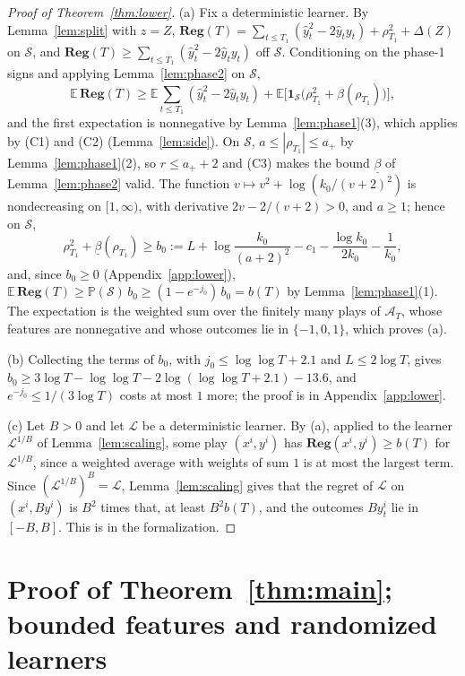 \documentclass[12pt]{amsart}
\theoremstyle{definition}
\numberwithin{equation}{section}
\newcommand{\E}{\mathbb{E}}
\newcommand{\Prob}{\mathbb{P}}
\newcommand{\Reg}{\mathbf{Reg}}
\newcommand{\yh}{\hat y}
\newcommand{\Succ}{\mathcal{S}}
\begin{document}
\begin{proof}[Proof of Theorem~\ref{thm:lower}]
(a) Fix a deterministic learner. By Lemma~\ref{lem:split} with $z=Z$, $\Reg(T)=\sum_{t\le T_1}(\yh_t^2-2\yh_ty_t)+\rho_{T_1}^2+\Delta(Z)$ on $\Succ$, and $\Reg(T)\ge\sum_{t\le T_1}(\yh_t^2-2\yh_ty_t)$ off $\Succ$. Conditioning on the phase-1 signs and applying Lemma~\ref{lem:phase2} on $\Succ$,
\[
\E\,\Reg(T)\ge\E\sum_{t\le T_1}(\yh_t^2-2\yh_ty_t)+\E\bigl[\mathbf 1_\Succ\bigl(\rho_{T_1}^2+\beta(\rho_{T_1})\bigr)\bigr],
\]
and the first expectation is nonnegative by Lemma~\ref{lem:phase1}(3), which applies by (C1) and (C2) (Lemma~\ref{lem:side}). On $\Succ$, $a\le|\rho_{T_1}|\le a_+$ by Lemma~\ref{lem:phase1}(2), so $r\le a_++2$ and (C3) makes the bound $\underline\beta$ of Lemma~\ref{lem:phase2} valid. The function $v\mapsto v^2+\log(k_0/(v+2)^2)$ is nondecreasing on $[1,\infty)$, with derivative $2v-2/(v+2)>0$, and $a\ge1$; hence on $\Succ$,
\[
\rho_{T_1}^2+\underline\beta(\rho_{T_1})\ge b_0:=L+\log\frac{k_0}{(a+2)^2}-c_1-\frac{\log k_0}{2k_0}-\frac1{k_0},
\]
and, since $b_0\ge0$ (Appendix~\ref{app:lower}), $\E\,\Reg(T)\ge\Prob(\Succ)\,b_0\ge(1-e^{-j_0})\,b_0=b(T)$ by Lemma~\ref{lem:phase1}(1). The expectation is the weighted sum over the finitely many plays of $\mathcal A_T$, whose features are nonnegative and whose outcomes lie in $\{-1,0,1\}$, which proves (a).

(b) Collecting the terms of $b_0$, with $j_0\le\log\log T+2.1$ and $L\le2\log T$, gives $b_0\ge3\log T-\log\log T-2\log(\log\log T+2.1)-13.6$, and $e^{-j_0}\le1/(3\log T)$ costs at most $1$ more; the proof is in Appendix~\ref{app:lower}.

(c) Let $B>0$ and let $\mathcal L$ be a deterministic learner. By (a), applied to the learner $\mathcal L^{1/B}$ of Lemma~\ref{lem:scaling}, some play $(x^i,y^i)$ has $\Reg(x^i,y^i)\ge b(T)$ for $\mathcal L^{1/B}$, since a weighted average with weights of sum $1$ is at most the largest term. Since $(\mathcal L^{1/B})^B=\mathcal L$, Lemma~\ref{lem:scaling} gives that the regret of $\mathcal L$ on $(x^i,By^i)$ is $B^2$ times that, at least $B^2b(T)$, and the outcomes $By^i_t$ lie in $[-B,B]$. This is  in the formalization.
\end{proof}

\section{Proof of Theorem~\ref{thm:main}; bounded features and randomized learners}\label{sec:proofmain}
\end{document}
